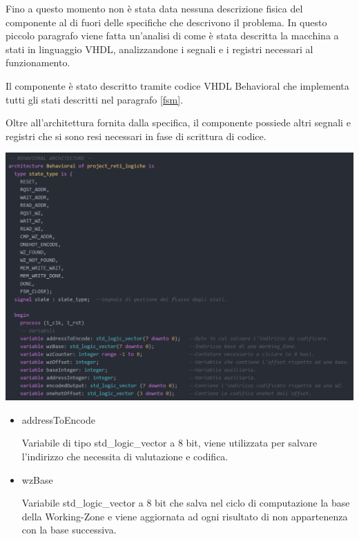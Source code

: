\documentclass{article}
\newenvironment{gitFont}{\fontfamily{zi4}\selectfont}{\par}
\begin{document}
\begin{flushleft}


Fino a questo momento non è stata data nessuna descrizione fisica del componente al di fuori delle specifiche che descrivono il problema. In questo piccolo paragrafo viene fatta un'analisi di come è stata descritta la macchina a stati in linguaggio VHDL, analizzandone i segnali e i registri necessari al funzionamento.

Il componente è stato descritto tramite codice VHDL Behavioral che implementa tutti gli stati descritti nel paragrafo \ref{fsm}.

 Oltre all'architettura fornita dalla specifica, il componente possiede altri segnali e registri che si sono resi necessari in fase di scrittura di codice.

\begin{flushleft}
\includegraphics[scale=0.31]{Behavioral}
\end{flushleft}


\begin{itemize}

\item \begin{gitFont}
addressToEncode
\end{gitFont} Variabile di tipo std{\_}logic{\_}vector a 8 bit, viene utilizzata per salvare l'indirizzo che necessita di valutazione e codifica.

\item \begin{gitFont}
wzBase
\end{gitFont} Variabile std{\_}logic{\_}vector a 8 bit che salva nel ciclo di computazione la base della Working-Zone e viene aggiornata ad ogni risultato di non appartenenza con la base successiva.


\end{itemize}
\end{flushleft}
\end{document}
